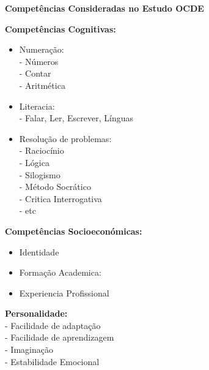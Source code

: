 \begin{center}\textbf{\Large Competências Consideradas no Estudo OCDE \cite{article_1}}
\end{center}
\begin{minipage}[t]{.5\linewidth}
\qquad \textbf{Competências Cognitivas:}
\begin{itemize}
\setlength\itemsep{-1em}
\item Numeração:\\
- Números\\
- Contar\\
- Aritmética\\
\item Literacia:\\
- Falar, Ler, Escrever, Línguas\\
\item Resolução de problemas:\\
- Raciocínio\\
- Lógica\\
- Silogismo\\
- Método Socrático\\
- Critica Interrogativa\\
- etc
\end{itemize}
\qquad \textbf{Competências Socioeconómicas:}
\begin{itemize}
\setlength\itemsep{-1em}
\item Identidade\\
\item Formação Academica:\\
\item Experiencia Profissional
\end{itemize}
\qquad \textbf{Personalidade:}\\
\hspace*{1cm}- Facilidade de adaptação\\
\hspace*{1cm}- Facilidade de aprendizagem\\
\hspace*{1cm}- Imaginação\\
\hspace*{1cm}- Estabilidade Emocional\\
\end{minipage}
